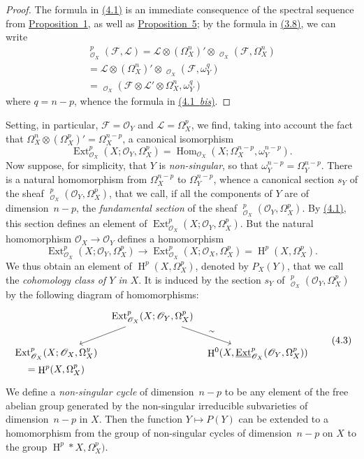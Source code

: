 \documentclass{article}
\newcommand{\scr}[1]{{\mathscr{#1}}}
\DeclareMathOperator{\Ext}{Ext}
\DeclareMathOperator{\Hom}{Hom}
\DeclareMathOperator{\shExt}{\underline{Ext}}
\DeclareMathOperator{\shHom}{\underline{Hom}}
\DeclareMathOperator{\HH}{H}
\newcommand{\oldpage}[1]{\marginpar{\footnotesize$\Big\vert$ \textit{p.~#1}}}
\begin{document}
\begin{proof}
  The formula in \hyperref[4.1]{(4.1)} is an immediate consequence of the spectral sequence from \hyperref[proposition1]{Proposition~1}, as well as \hyperref[proposition5]{Proposition~5};
  by the formula in \hyperref[3.8]{(3.8)}, we can write
\oldpage{149-10}
  \[
    \begin{gathered}
      \shExt_{\scr{O}_X}^p(\scr{F},\scr{L})
      = \scr{L}\otimes(\Omega_X^n)'\otimes\shExt_{\scr{O}_X}(\scr{F},\Omega_X^n)
    \\= \scr{L}\otimes(\Omega_X^n)'\otimes\shHom_{\scr{O}_X}(\scr{F},\omega_Y^q)
    \\= \shHom_{\scr{O}_X}(\scr{F}\otimes\scr{L}'\otimes\Omega_X^n,\omega_Y^q)
    \end{gathered}
  \]
  where $q=n-p$, whence the formula in \hyperref[4.1bis]{(4.1~\emph{bis})}.
\end{proof}

Setting, in particular, $\scr{F}=\scr{O}_Y$ and $\scr{L}=\Omega_X^p$, we find, taking into account the fact that $\Omega_X^n\otimes(\Omega_X^p)'=\Omega_X^{n-p}$, a canonical isomorphism
\[
\label{4.2}
  \Ext_{\scr{O}_X}^p(X;\scr{O}_Y,\Omega_X^p) = \Hom_{\scr{O}_X}(X;\Omega_X^{n-p},\omega_Y^{n-p}).
\tag{4.2}
\]
Now suppose, for simplicity, that $Y$ is \emph{non-singular}, so that $\omega_Y^{n-p}=\Omega_Y^{n-p}$.
There is a natural homomorphism from $\Omega_X^{n-p}$ to $\Omega_Y^{n-p}$, whence a canonical section $s_Y$ of the sheaf $\shExt_{\scr{O}_X}^p(\scr{O}_Y,\Omega_X^p)$, that we call, if all the components of $Y$ are of dimension~$n-p$, the \emph{fundamental section} of the sheaf $\shExt_{\scr{O}_X}^p(\scr{O}_Y,\Omega_X^p)$.
By \hyperref[4.1]{(4.1)}, this section defines an element of $\Ext_{\scr{O}_X}^p(X;\scr{O}_Y,\Omega_X^p)$.
But the natural homomorphism $\scr{O}_X\to\scr{O}_Y$ defines a homomorphism
\[
  \Ext_{\scr{O}_X}^p(X;\scr{O}_Y,\Omega_X^p) \to \Ext_{\scr{O}_X}^p(X;\scr{O}_X,\Omega_X^p) = \HH^p(X,\Omega_X^p).
\]
We thus obtain an element of $\HH^p(X,\Omega_X^p)$, denoted by $P_X(Y)$, that we call the \emph{cohomology class of $Y$ in $X$}.
It is induced by the section $s_Y$ of $\shExt_{\scr{O}_X}^p(\scr{O}_Y,\Omega_X^p)$ by the following diagram of homomorphisms:
\[
\label{4.3}
  \begin{tikzcd}[column sep=tiny]
    & \Ext_{\scr{O}_X}^p(X;\scr{O}_Y,\Omega_X^p) \ar[dl] \ar[dr,"\sim"]
  \\\Ext_{\scr{O}_X}^p(X;\scr{O}_X,\Omega_X^y) && \HH^0(X,\shExt_{\scr{O}_X}^p(\scr{O}_Y,\Omega_X^p))
  \\[-2em]=\HH^p(X,\Omega_X^p)
  \end{tikzcd}
\tag{4.3}
\]
We define a \emph{non-singular cycle} of dimension~$n-p$ to be any element of the free abelian group generated by the non-singular irreducible subvarieties of dimension~$n-p$ in $X$.
Then the function $Y\mapsto P(Y)$ can be extended to a homomorphism from the group of non-singular cycles of dimension~$n-p$ on $X$ to the group $\HH^p*X,\Omega_X^p)$.
\end{document}
